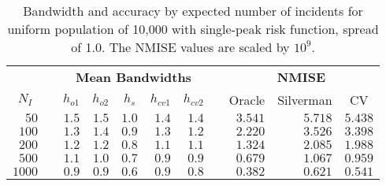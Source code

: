 \begin{table}[htbp]
\begin{center}
\begin{tabular}{rcrrrrrcrrr}
\toprule
\multicolumn{1}{c}{\bfseries }&\multicolumn{1}{c}{\bfseries }&\multicolumn{5}{c}{\bfseries Mean Bandwidths}&\multicolumn{1}{c}{\bfseries }&\multicolumn{3}{c}{\bfseries NMISE}\tabularnewline
\cline{3-7} \cline{9-11}
\multicolumn{1}{c}{$N_I$}&\multicolumn{1}{c}{}&\multicolumn{1}{c}{$h_{o1}$}&\multicolumn{1}{c}{$h_{o2}$}&\multicolumn{1}{c}{$h_{s}$}&\multicolumn{1}{c}{$h_{cv1}$}&\multicolumn{1}{c}{$h_{cv2}$}&\multicolumn{1}{c}{}&\multicolumn{1}{c}{Oracle}&\multicolumn{1}{c}{Silverman}&\multicolumn{1}{c}{CV}\tabularnewline
\midrule
$  50$&&$1.5$&$1.5$&$1.0$&$1.4$&$1.4$&&$3.541$&$5.718$&$5.438$\tabularnewline
$ 100$&&$1.3$&$1.4$&$0.9$&$1.3$&$1.2$&&$2.220$&$3.526$&$3.398$\tabularnewline
$ 200$&&$1.2$&$1.2$&$0.8$&$1.1$&$1.1$&&$1.324$&$2.085$&$1.988$\tabularnewline
$ 500$&&$1.1$&$1.0$&$0.7$&$0.9$&$0.9$&&$0.679$&$1.067$&$0.959$\tabularnewline
$1000$&&$0.9$&$0.9$&$0.6$&$0.9$&$0.8$&&$0.382$&$0.621$&$0.541$\tabularnewline
\bottomrule
\end{tabular}
\caption[Bandwidth and accuracy by expected number of incidents]{Bandwidth and accuracy by expected number of incidents for uniform population of 10,000 with single-peak risk function, spread of 1.0. The NMISE values are scaled by $10^9$.\label{tab:results:bandwidth_vs_mu}}\end{center}
\end{table}
